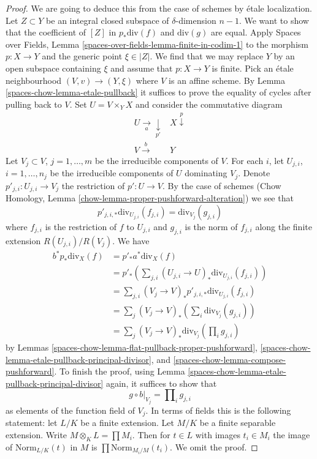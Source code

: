 \begin{proof}
We are going to deduce this from the case of schemes by \'etale localization.
Let $Z \subset Y$ be an integral closed subspace of $\delta$-dimension
$n - 1$. We want to show that the coefficient of $[Z]$ in
$p_*\text{div}(f)$ and $\text{div}(g)$ are equal. Apply
Spaces over Fields, Lemma \ref{spaces-over-fields-lemma-finite-in-codim-1}
to the morphism $p : X \to Y$ and the generic point $\xi \in |Z|$.
We find that we may replace $Y$ by an open subspace containing $\xi$
and assume that $p : X \to Y$ is finite. Pick an \'etale neighbourhood
$(V, v) \to (Y, \xi)$ where $V$ is an affine scheme.
By Lemma \ref{spaces-chow-lemma-etale-pullback} it suffices to prove the equality
of cycles after pulling back to $V$.
Set $U = V \times_Y X$ and consider the commutative diagram
$$
\begin{array}{cc}U \underset{a}{\longrightarrow}\underset{p'}{\downarrow} & X \overset{p}{\downarrow} \\ V \overset{b}{\longrightarrow} & Y\end{array}
$$
Let $V_j \subset V$, $j = 1, \ldots, m$ be the irreducible components
of $V$. For each $i$, let $U_{j, i}$, $i = 1, \ldots, n_j$ be the
irreducible components of $U$ dominating $V_j$. Denote
$p'_{j, i} : U_{j, i} \to V_j$ the restriction of $p' : U \to V$.
By the case of schemes
(Chow Homology, Lemma \ref{chow-lemma-proper-pushforward-alteration})
we see that
$$
p'_{j, i, *}\text{div}_{U_{j, i}}(f_{j, i}) = \text{div}_{V_j}(g_{j, i})
$$
where $f_{j, i}$ is the restriction of $f$ to $U_{j, i}$ and
$g_{j, i}$ is the norm of $f_{j, i}$ along the finite extension
$R(U_{j, i})/R(V_j)$. We have
\begin{align*}
b^* p_*\text{div}_X(f)
& =
p'_* a^* \text{div}_X(f) \\
& =
p'_*\left(\sum\nolimits_{j, i}
(U_{j, i} \to U)_*\text{div}_{U_{j, i}}(f_{j, i})\right) \\
& =
\sum\nolimits_{j, i}
(V_j \to V)_*p'_{j, i, *}\text{div}_{U_{j, i}}(f_{j, i}) \\
& =
\sum\nolimits_j
(V_j \to V)_*\left(\sum\nolimits_i \text{div}_{V_j}(g_{j, i})\right) \\
& =
\sum\nolimits_j (V_j \to V)_*\text{div}_{V_j}(\prod\nolimits_i g_{j, i})
\end{align*}
by Lemmas
\ref{spaces-chow-lemma-flat-pullback-proper-pushforward},
\ref{spaces-chow-lemma-etale-pullback-principal-divisor}, and
\ref{spaces-chow-lemma-compose-pushforward}.
To finish the proof, using Lemma \ref{spaces-chow-lemma-etale-pullback-principal-divisor}
again, it suffices to show that
$$
g \circ b|_{V_j} = \prod\nolimits_i g_{j, i}
$$
as elements of the function field of $V_j$. In terms of fields
this is the following statement: let $L/K$ be a finite extension.
Let $M/K$ be a finite separable extension. Write
$M \otimes_K L = \prod M_i$. Then for $t \in L$ with images
$t_i \in M_i$ the image of
$\text{Norm}_{L/K}(t)$ in $M$ is $\prod \text{Norm}_{M_i/M}(t_i)$.
We omit the proof.
\end{proof}

